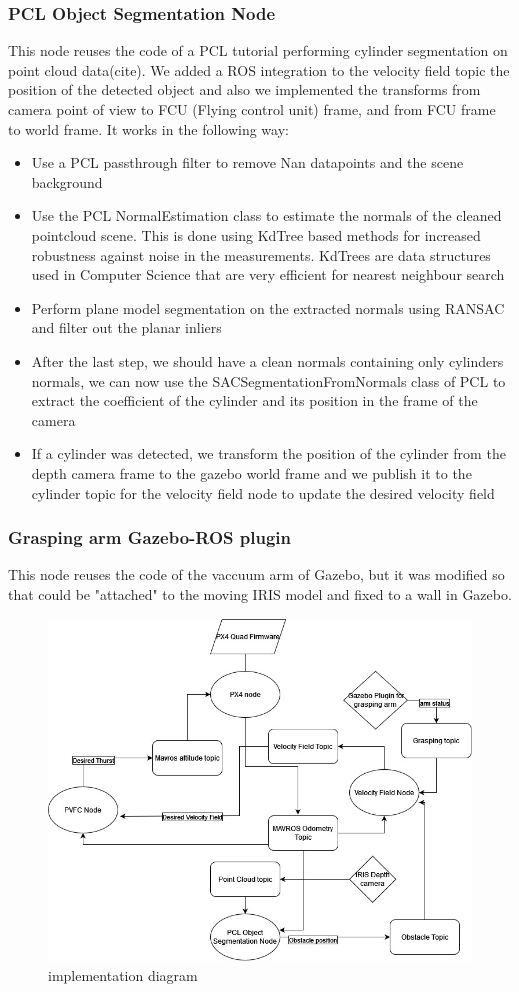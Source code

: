 \subsubsection{PCL Object Segmentation Node}
This node reuses the code of a PCL tutorial performing cylinder segmentation on point cloud data(cite). 
We added a ROS integration to the velocity field topic the position of the detected object and also we implemented the transforms from camera point of view to FCU (Flying control unit) frame, and from FCU frame to world frame. 
It works in the following way:
\begin{itemize}
    \item Use a PCL passthrough filter to remove Nan datapoints and the scene background
    \item Use the PCL NormalEstimation class to estimate the normals of the cleaned pointcloud scene. This is done using KdTree based methods for increased robustness against noise in the measurements. KdTrees are data structures used in Computer Science that are very efficient for nearest neighbour search
    \item Perform plane model segmentation on the extracted normals using RANSAC and filter out the planar inliers
    \item After the last step, we should have a clean normals containing only cylinders normals, we can now use the SACSegmentationFromNormals class of PCL to extract the coefficient of the cylinder and its position in the frame of the camera
    \item If a cylinder was detected, we transform the position of the cylinder from the depth camera frame to the gazebo world frame and we publish it to the cylinder topic for the velocity field node to update the desired velocity field
\end{itemize}
\subsubsection{Grasping arm Gazebo-ROS plugin}    
This node reuses the code of the vaccuum arm of Gazebo, but it was modified so that could be "attached" to the moving IRIS model and fixed to a wall in Gazebo. 

\begin{figure}[h!]
    \centering
    \includegraphics[width=\linewidth]{Images/implementation diagram.jpg}
    \caption{implementation diagram}
    \label{fig:implementationdiagram}
\end{figure}


